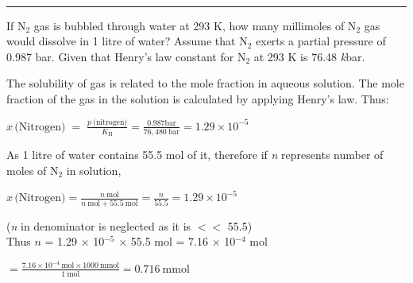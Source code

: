 \documentclass[11pt,a4paper]{article}
\begin{document}
\vspace{10pt}
\begin{tcolorbox}[enhanced,colback=white,colframe=gray!40,boxrule=0.8pt,arc=2mm,left=24pt,right=8pt,top=4pt,bottom=6pt,boxsep=0pt,drop fuzzy shadow=gray!40,overlay={\fill[SkyBlue] (frame.south west) rectangle ([xshift=14pt]frame.north west);}]
\noindent\begin{minipage}[t]{0.17\linewidth}
\\[-3pt]
{\color{DeepSkyBlue3}\rule{\linewidth}{0.8pt}}
\end{minipage}\hfill
\begin{minipage}[t]{0.81\linewidth}
If N$_2$ gas is bubbled through water at 293 K, how many millimoles of N$_2$ gas would dissolve in 1 litre of water? Assume that N$_2$ exerts a partial pressure of 0.987 bar. Given that Henry's law constant for N$_2$ at 293 K is 76.48 \textit{k}bar.
\end{minipage}

\vspace{8pt}
\noindent\begin{minipage}[t]{0.17\linewidth}
\end{minipage}\hfill
\begin{minipage}[t]{0.81\linewidth}
The solubility of gas is related to the mole fraction in aqueous solution. The mole fraction of the gas in the solution is calculated by applying Henry's law. Thus:

\noindent$\displaystyle x\,\text{(Nitrogen)} \;=\; \frac{p\ \text{(nitrogen)}}{K_\text{H}} = \frac{0.987\text{bar}}{76{,}480\ \text{bar}} = 1.29 \times 10^{-5}$

As 1 litre of water contains 55.5 mol of it, therefore if \textit{n} represents number of moles of N$_2$ in solution,

\noindent$\displaystyle x\,\text{(Nitrogen)} = \frac{n\ \text{mol}}{n\ \text{mol} + 55.5\ \text{mol}} = \frac{n}{55.5} = 1.29 \times 10^{-5}$

(\textit{n} in denominator is neglected as it is $<<$ 55.5)\\
Thus $n$ = 1.29 $\times$ 10$^{-5}$ $\times$ 55.5 mol = 7.16 $\times$ 10$^{-4}$ mol

\noindent$\displaystyle = \frac{7.16{\times}10^{-4}\ \text{mol} \times 1000\ \text{mmol}}{1\ \text{mol}} = 0.716\ \text{mmol}$
\end{minipage}
\end{tcolorbox}
\end{document}
